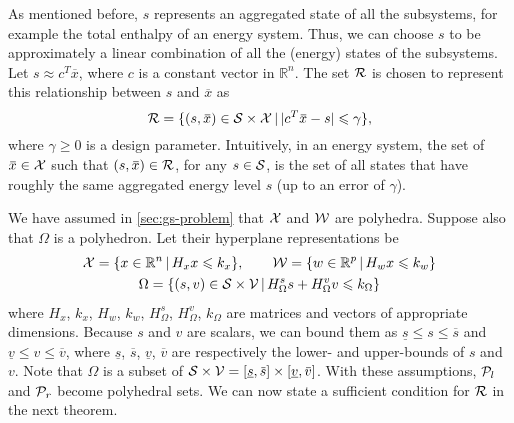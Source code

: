 As mentioned before, %
$s$ represents an aggregated state of all the subsystems, for example the total enthalpy of an energy system.
Thus, we can choose $s$ to be approximately a linear combination of all the (energy) states of the subsystems.
Let $s \approx c^{T} \overbar{x}$, where $c$ is a constant vector in $\mathbb{R}^{n}$.
The set $\mathcal{R}$ is chosen to represent this relationship between $s$ and $\overbar{x}$ as 
\begin{equation}
  \label{eq:abstraction-gs:R}
  \RSet = \{ (s,\overbar{x}) \in \SSet \times \XSet \,|\, | c^{T} \overbar{x} - s | \leqslant \gamma \} \text,
\end{equation}
where $\gamma \geqslant 0$ is a design parameter.
Intuitively, in an energy system, the set of $\overbar{x} \in \XSet$ such that $(s,\overbar{x}) \in \RSet$, for any $s \in \mathcal{S}$, is the set of all states that have roughly the same aggregated energy level $s$ (up to an error of $\gamma$).

We have assumed in \cref{sec:gs-problem} that $\mathcal{X}$ and $\mathcal{W}$ are polyhedra.
Suppose also that $\Omega$ is a polyhedron.
Let their hyperplane representations be
\begin{gather*}
  \mathcal{X} = \{ x \in \mathbb{R}^{n} \,|\, H_{x} x \leqslant k_{x} \}, \qquad
  \mathcal{W} = \{ w \in \mathbb{R}^{p} \,|\, H_{w} x \leqslant k_{w} \}\\
  \Omega = \{ (s,v) \in \mathcal{S} \times \mathcal{V} \,|\, H_{\Omega}^{s} s + H_{\Omega}^{v} v \leqslant k_{\Omega} \}
\end{gather*}
where $H_{x}$, $k_{x}$, $H_{w}$, $k_{w}$, $H_{\Omega}^{s}$, $H_{\Omega}^{v}$, $k_{\Omega}$ are matrices and vectors of appropriate dimensions.
Because $s$ and $v$ are scalars, we can bound them as $\underline{s} \leqslant s \leqslant \overbar{s}$ and $\underline{v} \leqslant v \leqslant \overbar{v}$, where $\underline{s}$, $\overbar{s}$, $\underline{v}$, $\overbar{v}$ are respectively the lower- and upper-bounds of $s$ and $v$.
Note that $\Omega$ is a subset of $\SSet \times \VSet = [\underline{s},\overbar{s}] \times [\underline{v},\overbar{v}]$.
With these assumptions, $\mathcal{P}_{l}$ and $\mathcal{P}_{r}$ become polyhedral sets.
We can now state a sufficient condition for $\mathcal{R}$ in the next theorem.

